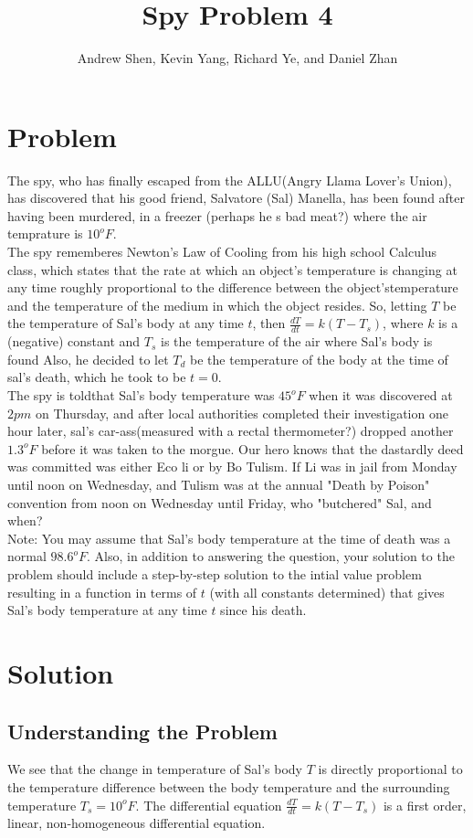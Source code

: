 \documentclass{article}
\title{Spy Problem 4}
\author{Andrew Shen, Kevin Yang, Richard Ye, and Daniel Zhan}
\begin{document}
	\maketitle
	\section{Problem}
	The spy, who has finally escaped from the ALLU(Angry Llama Lover's Union), has discovered that his good friend, Salvatore (Sal) Manella, has been found after having been murdered, in a freezer (perhaps he s bad meat?) where the air temprature is $10^oF$.
	\\
	The spy rememberes Newton's Law of Cooling from his high school Calculus class, which states that the rate at which an object's temperature is changing at any time roughly proportional to the difference between the object'stemperature and the temperature of the medium in which the object resides. So, letting $T$ be the temperature of Sal's body at any time $t$, then $\frac{dT}{dt} = k(T-T_s)$, where $k$ is a (negative) constant and $T_s$ is the temperature of the air where Sal's body is found Also, he decided to let $T_d$ be the temperature of the body at the time of sal's death, which he took to be $t=0$.
	\\
	The spy is toldthat Sal's body temperature was $45^oF$ when it was discovered at $2 pm$ on Thursday, and after local authorities completed their investigation one hour later, sal's car-ass(measured with a rectal thermometer?) dropped another $1.3^oF$ before it was taken to the morgue. Our hero knows that the dastardly deed was committed was either Eco li or by Bo Tulism. If Li was in jail from Monday until noon on Wednesday, and Tulism was at the annual "Death by Poison" convention from noon on Wednesday until Friday, who "butchered" Sal, and when?
	\\
	Note: You may assume that Sal's body temperature at the time of death was a normal $98.6^oF$. Also, in addition to answering the question, your solution to the problem should include a step-by-step solution to the intial value problem resulting in a function in terms of $t$ (with all constants determined) that gives Sal's body temperature at any time $t$ since his death.
	\section{Solution}
	\subsection{Understanding the Problem}
	We see that the change in temperature of Sal's body $T$ is directly proportional to the temperature difference between the body temperature and the surrounding temperature $T_s = 10^oF$. The differential equation $\frac{dT}{dt} = k(T-T_s)$ is a first order, linear, non-homogeneous differential equation.
\end{document}
